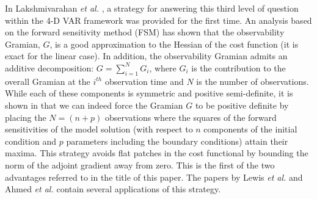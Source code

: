 \documentclass{article}
\begin{document}
In Lakshmivarahan \emph{et al.} \cite{lakshmivarahan2020controlling,lakshmivarahan2022observability}, a strategy for answering this third level of question within the 4-D VAR framework was provided for the first time. \textcolor{rev}{An analysis based on the forward sensitivity method (FSM) has shown that the observability Gramian, $G$, is a good approximation to the Hessian of the cost function (it is exact for the linear case)}. In addition, the observability Gramian admits an additive decomposition: $G = \sum_{i=1}^{N}G_{i}$, where $G_{i}$ is the contribution to the overall Gramian at the $i^{th}$ observation time and $N$ is the number of observations. While each of these components is symmetric and positive semi-definite, it is shown in \cite{lakshmivarahan2020controlling,lakshmivarahan2022observability} that we can indeed force the Gramian $G$ to be positive definite by placing the $N = (n+p)$ observations where the squares of the forward sensitivities of the model solution (with respect to $n$ components of the initial condition and $p$ parameters including the boundary conditions) attain their maxima. This strategy avoids flat patches in the cost functional by bounding the norm of the adjoint gradient away from zero. This is the first of the two advantages referred to in the title of this paper. The papers by Lewis \emph{et al.} \cite{lewis2020placement,lewis2022placement} and Ahmed \emph{et al.} \cite{ahmed2020forward, ahmed2022forward} contain several applications of this strategy.
\end{document}
